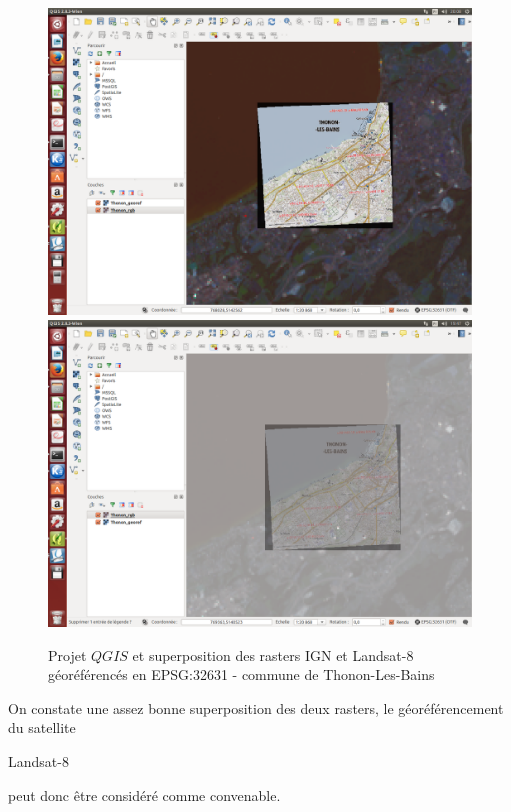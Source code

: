\documentclass{book}
\begin{document}
\begin{figure}[H]
\begin{center}
\includegraphics[scale=0.3]{images/georeferencing/qgis-superposition0.png}
\includegraphics[scale=0.3]{images/georeferencing/qgis-superposition.png}
\end{center}
\caption{Projet $QGIS$ et superposition des rasters IGN et Landsat-8 géoréférencés en EPSG:32631 - commune de Thonon-Les-Bains}
\label{qgis_super}
\end{figure}

On constate une assez bonne superposition des deux rasters, le géoréférencement du satellite \begin{itshape}Landsat-8\end{itshape} peut
 donc \^{e}tre considéré comme convenable.
\end{document}
